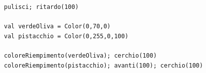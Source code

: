   

\begin{lstlisting}[basicstyle={\ttfamily\fontsize{16}{19}\selectfont},numbers=none]
pulisci; ritardo(100)      

val verdeOliva = Color(0,70,0)
val pistacchio = Color(0,255,0,100)

coloreRiempimento(verdeOliva); cerchio(100)
coloreRiempimento(pistacchio); avanti(100); cerchio(100)
\end{lstlisting}
        
